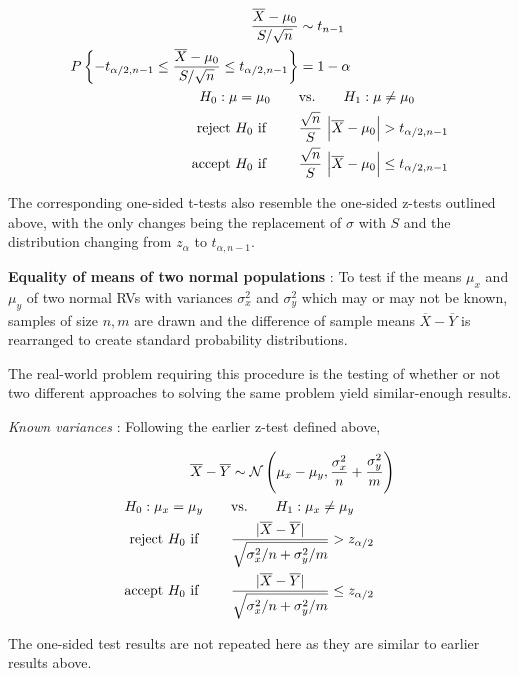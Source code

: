 \begin{align}
	\frac{\overline{X} - \mu_0}{S / \sqrt{n}} &\sim t_{n-1} \nonumber \\
	P \left\{ -t_{\alpha/2, n-1} \leq \frac{\overline{X} - \mu_0}{S / \sqrt{n}} \leq t_{\alpha/2, n-1} \right\} &= 1- \alpha \nonumber \\
	H_0 : \mu = \mu_0 \qquad &\text{vs.} \qquad H_1 : \mu \neq \mu_0 \nonumber \\
	\text{reject $ H_0 $ if } \qquad & \frac{\sqrt{n}}{S}\ \Big| \overline{X} - \mu_0 \Big| > t_{\alpha/2, n-1} \nonumber \\
	\text{accept $ H_0 $ if } \qquad & \frac{\sqrt{n}}{S}\ \Big| \overline{X} - \mu_0 \Big| \leq t_{\alpha/2, n-1}
\end{align}

The corresponding one-sided t-tests also resemble the one-sided z-tests outlined above, with the only changes being the replacement of $ \sigma $ with $ S $ and the distribution changing from $ z_\alpha $ to $ t_{\alpha, n-1} $.

\textbf{Equality of means of two normal populations} : To test if the means $ \mu_x $ and $ \mu_y $ of two normal RVs with variances $ \sigma_x^2 $ and $ \sigma_y^2 $ which may or may not be known, samples of size $ n, m $ are drawn and the difference of sample means $ \overline{X} - \overline{Y} $ is rearranged to create standard probability distributions.

The real-world problem requiring this procedure is the testing of whether or not two different approaches to solving the same problem yield similar-enough results.

\textit{Known variances} : Following the earlier z-test defined above,

\begin{align}
	\overline{X} - \overline{Y} &\sim \mathcal{N}\left( \mu_x - \mu_y, \frac{\sigma_x^2}{n} + \frac{\sigma_y^2}{m} \right) \nonumber \\
	H_0 : \mu_x = \mu_y \qquad &\text{vs.} \qquad H_1 : \mu_x \neq \mu_y \nonumber \\
	\text{reject $ H_0 $ if } \qquad & \frac{\displaystyle | \overline{X} - \overline{Y} |}{\displaystyle \sqrt{\sigma_x^2/n + \sigma_y^2/m}} > z_{\alpha/2}  \nonumber \\
	\text{accept $ H_0 $ if } \qquad & \frac{\displaystyle | \overline{X} - \overline{Y} |}{\displaystyle \sqrt{\sigma_x^2/n + \sigma_y^2/m}} \leq z_{\alpha/2}
\end{align}

The one-sided test results are not repeated here as they are similar to earlier results above.

